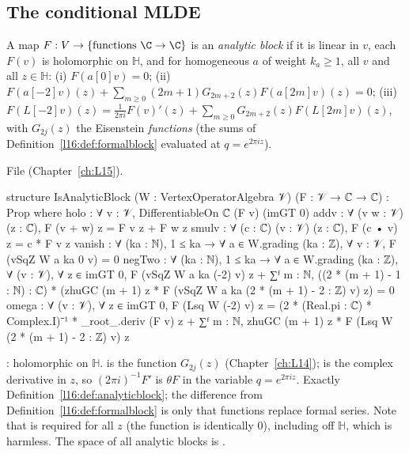 \subsection{The conditional MLDE}

\begin{definition}\label{l16:def:analyticblock}
A map $F:V\to\{\text{functions }\C\to\C\}$ is an \emph{analytic block} if it is linear in $v$, each $F(v)$ is holomorphic on
$\mathbb H$, and for homogeneous $a$ of weight $k_a\ge1$, all $v$ and all $z\in\mathbb H$: (i) $F(a[0]v) = 0$; (ii)
$F(a[-2]v)(z) + \sum_{m\ge0}(2m+1)G_{2m+2}(z)F(a[2m]v)(z) = 0$; (iii)
$F(L[-2]v)(z) = \frac1{2\pi i}F(v)'(z) + \sum_{m\ge0}G_{2m+2}(z)F(L[2m]v)(z)$, with $G_{2j}(z)$ the Eisenstein
\emph{functions} (the sums of Definition~\ref{l16:def:formalblock} evaluated at $q = e^{2\pi iz}$).
\end{definition}
\noindent File  (Chapter~\ref{ch:L15}).
\begin{leancode}
structure IsAnalyticBlock (W : VertexOperatorAlgebra 𝒱) (F : 𝒱 → ℂ → ℂ) : Prop where
  holo : ∀ v : 𝒱, DifferentiableOn ℂ (F v) (imGT 0)
  addv : ∀ (v w : 𝒱) (z : ℂ), F (v + w) z = F v z + F w z
  smulv : ∀ (c : ℂ) (v : 𝒱) (z : ℂ), F (c • v) z = c * F v z
  vanish : ∀ (ka : ℕ), 1 ≤ ka → ∀ a ∈ W.grading (ka : ℤ), ∀ v : 𝒱, F (vSqZ W a ka 0 v) = 0
  negTwo : ∀ (ka : ℕ), 1 ≤ ka → ∀ a ∈ W.grading (ka : ℤ), ∀ (v : 𝒱), ∀ z ∈ imGT 0,
    F (vSqZ W a ka (-2) v) z
      + ∑ᶠ m : ℕ, ((2 * (m + 1) - 1 : ℕ) : ℂ)
          * (zhuGC (m + 1) z * F (vSqZ W a ka (2 * (m + 1) - 2 : ℤ) v) z) = 0
  omega : ∀ (v : 𝒱), ∀ z ∈ imGT 0,
    F (Lsq W (-2) v) z
      = (2 * (Real.pi : ℂ) * Complex.I)⁻¹ * _root_.deriv (F v) z
        + ∑ᶠ m : ℕ, zhuGC (m + 1) z * F (Lsq W (2 * (m + 1) - 2 : ℤ) v) z
\end{leancode}

\begin{dictionary}
: holomorphic on $\mathbb H$.  is the function $G_{2j}(z)$
(Chapter~\ref{ch:L14});  is the complex derivative in $z$, so
$(2\pi i)^{-1}F'$ is $\theta F$ in the variable $q = e^{2\pi iz}$. Exactly Definition~\ref{l16:def:analyticblock}; the
difference from Definition~\ref{l16:def:formalblock} is only that functions replace formal series. Note that 
is required for all $z$ (the function is identically $0$), including off $\mathbb H$, which is harmless. The space of all
analytic blocks is .
\end{dictionary}

